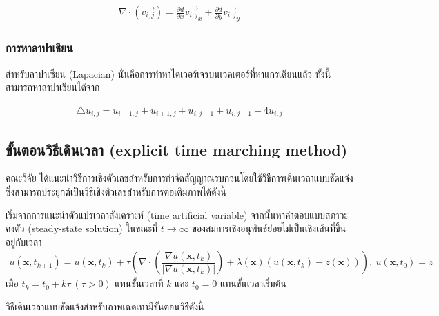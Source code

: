 \begin{align*} 
	\nabla \cdot (\vec{v_{i,j}}) = \frac{\partial d}{\partial x}\vec{v_{i,j}}_x + \frac{\partial d}{\partial y}\vec{v_{i,j}}_y
\end{align*}

\subsubsection{การหาลาปาเชียน}
\noindent\hspace{1cm}สำหรับลาปาเซียน (Lapacian) นั่นคือการทำหาไดเวอร์เจรบนเวคเตอร์ที่หาแกรเดียนแล้ว ทั้งนี้สามารถหาลาปาเชียนได้จาก

\begin{align*}
	\triangle u_{i,j} = u_{i-1,j} + u_{i+1,j} + u_{i,j-1} + u_{i,j+1} - 4 u_{i,j} 
\end{align*}

\subsection{ขั้นตอนวิธีเดินเวลา (explicit time marching method)}

\hspace{1cm} คณะวิจัย \cite{ref:ROF-template} ได้แนะนำวิธีการเชิงตัวเลขสำหรับการกำจัดสัญญาณรบกวนโดยใช้วิธีการเดินเวลาแบบชัดแจ้ง ซึ่งสามารถประยุกต์เป็นวิธีเชิงตัวเลขสำหรับการต่อเติมภาพได้ดังนี้
	
\hspace{1cm} เริ่มจากการแนะนําตัวแปรเวลาสังเคราะห์ (time artificial variable) จากนั้นหาคําตอบแบบสภาวะคงตัว (steady-state solution) ในขณะที่ $t\rightarrow \infty$ ของสมการเชิงอนุพันธ์ย่อยไม่เป็นเชิงเส้นที่ขึ้นอยู่กับเวลา 
\begin{align}
	u(\mathbf{x},t_{k+1})=u(\mathbf{x},t_{k})+\tau\left(\nabla \cdot\left(\dfrac{\nabla u (\mathbf{x},t_k)}{| \nabla u (\mathbf{x},t_k) | }\right) + \lambda(\mathbf{x})(u (\mathbf{x},t_k)-z(\mathbf{x})) \right),\ u(\mathbf{x},t_0)=z
	\label{e4}
\end{align}
เมื่อ $t_k=t_0+k\tau\ (\tau>0)$  แทนขั้นเวลาที่ $k$ และ $t_0=0$ แทนขั้นเวลาเริ่มต้น
	
 \vspace{0.5cm} \hspace{0.5cm}วิธีเดินเวลาแบบชัดแจ้งสำหรับภาพเฉดเทามีขั้นตอนวิธีดังนี้  \\
 




